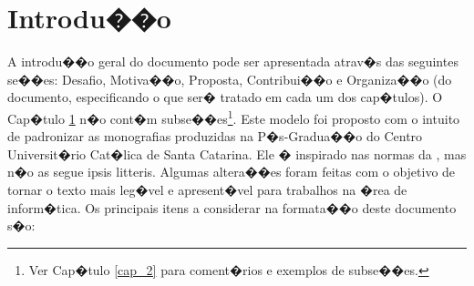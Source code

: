 \documentclass[msc, oneside]{ppgiathesis}
\begin{document}
\mainmatter

\changepage

\chapter{Introdu��o}\label{cap_1}

A introdu��o geral do documento pode ser apresentada atrav�s das
seguintes se��es: Desafio, Motiva��o, Proposta, Contribui��o e
Organiza��o (do documento, especificando o que ser� tratado em
cada um dos cap�tulos). O Cap�tulo \ref{cap_1} n�o cont�m
subse��es\footnote{Ver Cap�tulo \ref{cap_2} para coment�rios e
exemplos de subse��es.}. Este modelo foi proposto com o intuito de
padronizar as monografias produzidas na
P�s-Gradua��o do Centro Universit�rio Cat�lica de Santa Catarina. Ele � inspirado nas normas da
\cite{isk00}, mas n�o as segue ipsis litteris. Algumas
altera��es foram feitas com o objetivo de tornar o texto mais
leg�vel e apresent�vel para trabalhos na �rea de inform�tica. Os
principais itens a considerar na formata��o deste documento s�o:
\end{document}
